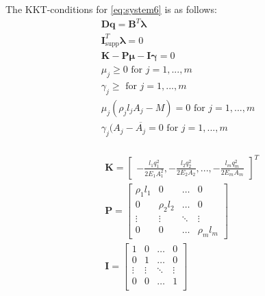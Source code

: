 

The KKT-conditions for \eqref{eq:system6} is as follows:
\begin{equation}
\begin{aligned}
\bm{Dq} = \bm{B}^{T}\bm{\lambda}\\
\bm{I}^{T}_{\textrm{supp}}\bm{\lambda} = 0 \\
\bm{K} - \bm{P}\bm{\mu} - \bm{I}\bm{\gamma} = 0 \\
\mu_j \geq 0  \text{ for } j = 1,...,m \\
\gamma_j \geq \text{ for } j = 1,...,m \\
\mu_j(\rho_{j}l_{j}A_{j}-M) = 0 \text{ for } j = 1,...,m \\
\gamma_{j}(A_{j}-\overline{A_{j}} = 0 \text{ for } j = 1,...,m \\
\end{aligned}
\end{equation}

\begin{align*}
&\bm{K} = \begin{bmatrix}
       -\frac{l_{1}q_{1}^2}{2E_{1}A_{1}^2}
       , -\frac{l_{2}q_{2}^2}{2E_{2}A_{2}}, ...,-\frac{l_{m}q_{m}^2}{2E_{m}A_{m}}
     \end{bmatrix}^T \\
&\bm{P} = \begin{bmatrix}
\rho_{1}l_{1} &  0  & \ldots & 0\\
0  &  \rho_{2}l_{2} & \ldots & 0\\
\vdots & \vdots & \ddots & \vdots\\
0  &   0       &\ldots & \rho_{m}l_{m}
\end{bmatrix}\\
&\bm{I} = \begin{bmatrix}
1 &  0  & \ldots & 0\\
0  &  1 & \ldots & 0\\
\vdots & \vdots & \ddots & \vdots\\
0  &   0  &\ldots & 1 \\
\end{bmatrix}
\end{align*}

